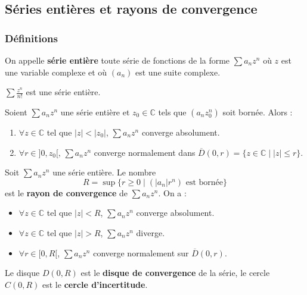 




	\subsection{Séries entières et rayons de convergence}

	\subsubsection{Définitions}


	\begin{definition}
		On appelle \textbf{série entière} toute série de fonctions de la forme $\sum a_n z^n$ où $z$ est une variable complexe et où $(a_n)$ est une suite complexe.
	\end{definition}

	\begin{example}
		$\sum \frac{z^n}{n!}$ est une série entière.
	\end{example}

	\begin{lemma}[Abel]
		Soient $\sum a_n z^n$ une série entière et $z_0 \in \mathbb{C}$ tels que $(a_n z_0^n)$ soit bornée. Alors :
		\begin{enumerate}[label=(\roman*)]
			\item $\forall z \in \mathbb{C}$ tel que $|z| < |z_0|$, $\sum a_n z^n$ converge absolument.
			\item $\forall r \in ]0,z_0[, \, \sum a_n z^n$ converge normalement dans $\overline{D}(0, r) = \{ z \in \mathbb{C} \mid |z| \leq r \}$.
		\end{enumerate}
	\end{lemma}

	\begin{definition}
		Soit $\sum a_n z^n$ une série entière. Le nombre
		\[ R = \sup \{ r \geq 0 \mid (|a_n|r^n) \text{ est bornée} \} \]
		est le \textbf{rayon de convergence} de $\sum a_n z^n$. On a :
		\begin{itemize}
			\item $\forall z \in \mathbb{C}$ tel que $|z| < R$, $\sum a_n z^n$ converge absolument.
			\item $\forall z \in \mathbb{C}$ tel que $|z| > R$, $\sum a_n z^n$ diverge.
			\item $\forall r \in [0,R[$, $\sum a_n z^n$ converge normalement sur $\overline{D}(0,r)$.
		\end{itemize}
		Le disque $D(0,R)$ est le \textbf{disque de convergence} de la série, le cercle $C(0,R)$ est le \textbf{cercle d'incertitude}.
	\end{definition}

